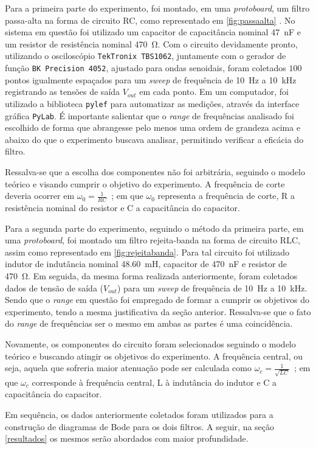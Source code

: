 Para a primeira parte do experimento, foi montado, em uma \textit{protoboard}, um filtro passa-alta na forma de  circuito RC, como representado em \cref{fig:passaalta} . No sistema em questão foi utilizado um capacitor de capacitância nominal \SI{47}{\nano\farad} e um resistor de resistência nominal \SI{470}{\ohm}. Com o circuito devidamente pronto, utilizando o osciloscópio \texttt{TekTronix TBS1062}\cite{ref:osciloscopio}, juntamente com o gerador de função \texttt{BK Precision 4052}\cite{ref:gerador}, ajustado para ondas senoidais, foram coletados $100$ pontos igualmente espaçados para um \textit{sweep} de frequência de \SI{10}{\hertz} a \SI{10}{\kilo\hertz} registrando as tensões de saída $V_{out}$ em cada ponto. Em um computador, foi utilizado a biblioteca \texttt{pylef}\cite{ref:pylef} para automatizar as medições, através da interface gráfica \texttt{PyLab}. É importante salientar que o \textit{range} de frequências analisado foi escolhido de forma que abrangesse pelo menos uma ordem de grandeza acima e abaixo do que o experimento buscava analisar, permitindo verificar a eficácia do filtro.

Ressalva-se que a escolha dos componentes não foi arbitrária, seguindo o modelo teórico e visando cumprir o objetivo do experimento. A frequência de corte deveria ocorrer em $\omega_0=\frac{1}{RC}$~\cite{ref:circuitos}; em que $\omega_0$ representa a frequência de corte, R a resistência nominal do resistor e C a capacitância do capacitor.

Para a segunda parte do experimento, seguindo o método da primeira parte, em uma \textit{protoboard}, foi montado um filtro rejeita-banda na forma de circuito RLC, assim como representado em \ref{fig:rejeitabanda}. Para tal circuito foi utilizado indutor de indutância nominal \SI{48,60}{\milli\henry}, capacitor de \SI{470}{\nano\farad} e resistor de \SI{470}{\ohm}. Em seguida, da mesma forma realizada anteriormente, foram coletados dados de tensão de saída ($V_{out}$) para um \textit{sweep} de frequência de \SI{10}{\hertz} a \SI{10}{\kilo\hertz}. Sendo que o \textit{range} em questão foi empregado de formar a cumprir os objetivos do experimento, tendo a mesma justificativa da seção anterior. Ressalva-se que o fato do \textit{range} de frequências ser o mesmo em ambas as partes é uma coincidência.

Novamente, os componentes do circuito foram selecionados seguindo o modelo teórico e buscando atingir os objetivos do experimento. A frequência central, ou seja, aquela que sofreria maior atenuação pode ser calculada como $\omega_c=\frac{1}{\sqrt{LC}}$~\cite{ref:circuitos}; em que $\omega_c$ corresponde à frequência central, L à indutância do indutor e C a capacitância do capacitor.

Em sequência, os dados anteriormente coletados foram utilizados para a construção de diagramas de Bode para os dois filtros. A seguir, na seção \ref{resultados} os mesmos serão abordados com maior profundidade.

